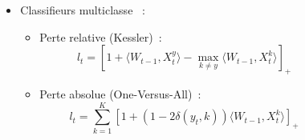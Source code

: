 \documentclass{beamer}
\begin{document}
\begin{frame}
\begin{columns}
\begin{column}{.2 \linewidth}
		\end{column}
		\begin{column}{.8 \linewidth}
			\begin{itemize}
				\item Classifieurs multiclasse ~:
				\begin{itemize}
					\item Perte relative (Kessler)~:
					$$l_t =  \left[ 1 +  \langle W_{t-1}, X_t^y \rangle - \max_{k \neq y} \langle W_{t-1}, X_t^k\rangle\right]_+$$
					\item Perte absolue (One-Versus-All)~:
					$$l_t = \sum_{k=1}^K \left[1 + (1 - 2 \delta(y_t,k)) \langle W_{t-1}, X_t^k\rangle\right]_+$$
					
				\end{itemize}
			\end{itemize}
		\end{column}		
	\end{columns}
\end{frame}
\end{document}
